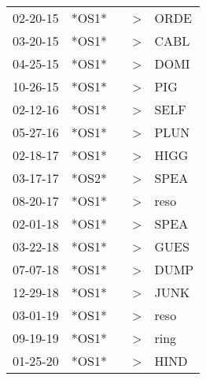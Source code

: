 \begin{supertabular}{lllll}
 02-20-15 &  *OS1* &   &  \textgreater &  ORDE \\
 03-20-15 &  *OS1* &   &  \textgreater &  CABL \\
 04-25-15 &  *OS1* &   &  \textgreater &  DOMI \\
 10-26-15 &  *OS1* &   &  \textgreater &   PIG \\
 02-12-16 &  *OS1* &   &  \textgreater &  SELF \\
 05-27-16 &  *OS1* &   &  \textgreater &  PLUN \\
 02-18-17 &  *OS1* &   &  \textgreater &  HIGG \\
 03-17-17 &  *OS2* &   &  \textgreater &  SPEA \\
 08-20-17 &  *OS1* &   &  \textgreater &  reso \\
 02-01-18 &  *OS1* &   &  \textgreater &  SPEA \\
 03-22-18 &  *OS1* &   &  \textgreater &  GUES \\
 07-07-18 &  *OS1* &   &  \textgreater &  DUMP \\
 12-29-18 &  *OS1* &   &  \textgreater &  JUNK \\
 03-01-19 &  *OS1* &   &  \textgreater &  reso \\
 09-19-19 &  *OS1* &   &  \textgreater &  ring \\
 01-25-20 &  *OS1* &   &  \textgreater &  HIND \\
\end{supertabular}
